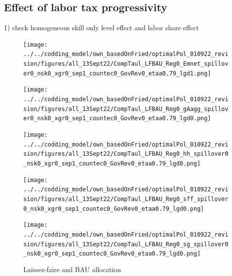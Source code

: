 \subsection{Effect of labor tax progressivity}
1) check homogeneous skill \ar only level effect and labor share effect

\begin{figure}[h!!]
	\centering
	\caption{Laissez-faire and BAU allocation }\label{fig:LF_BAU}
	\begin{minipage}[]{0.32\textwidth}
		\texttt{[image: ../../codding\_model/own\_basedOnFried/optimalPol\_010922\_revision/figures/all\_13Sept22/CompTaul\_LFBAU\_Reg0\_Emnet\_spillover0\_nsk0\_xgr0\_sep1\_countec0\_GovRev0\_etaa0.79\_lgd1.png]}
	\end{minipage}	
	\begin{minipage}[]{0.32\textwidth}
		\texttt{[image: ../../codding\_model/own\_basedOnFried/optimalPol\_010922\_revision/figures/all\_13Sept22/CompTaul\_LFBAU\_Reg0\_gAagg\_spillover0\_nsk0\_xgr0\_sep1\_countec0\_GovRev0\_etaa0.79\_lgd0.png]}
	\end{minipage}	
	\begin{minipage}[]{0.32\textwidth}
		\texttt{[image: ../../codding\_model/own\_basedOnFried/optimalPol\_010922\_revision/figures/all\_13Sept22/CompTaul\_LFBAU\_Reg0\_hh\_spillover0\_nsk0\_xgr0\_sep1\_countec0\_GovRev0\_etaa0.79\_lgd0.png]}
	\end{minipage}	
	\begin{minipage}[]{0.32\textwidth}
		\texttt{[image: ../../codding\_model/own\_basedOnFried/optimalPol\_010922\_revision/figures/all\_13Sept22/CompTaul\_LFBAU\_Reg0\_sff\_spillover0\_nsk0\_xgr0\_sep1\_countec0\_GovRev0\_etaa0.79\_lgd0.png]}
	\end{minipage}		
	\begin{minipage}[]{0.32\textwidth}
		\texttt{[image: ../../codding\_model/own\_basedOnFried/optimalPol\_010922\_revision/figures/all\_13Sept22/CompTaul\_LFBAU\_Reg0\_sg\_spillover0\_nsk0\_xgr0\_sep1\_countec0\_GovRev0\_etaa0.79\_lgd0.png]}

\end{minipage}
\end{figure}
